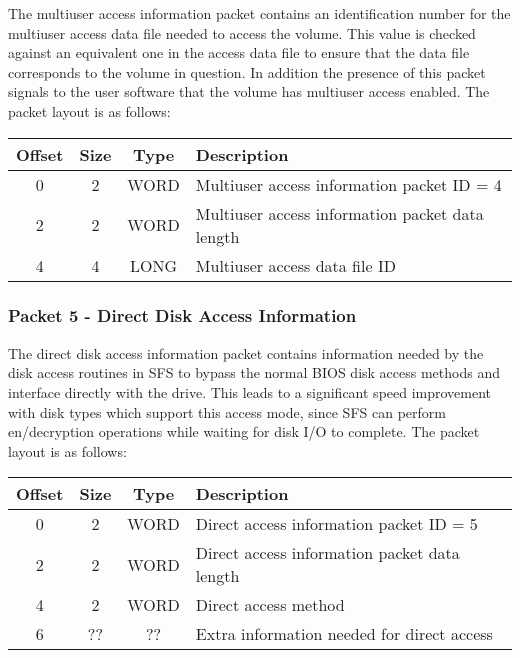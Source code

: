 The multiuser access information packet contains an identification number for
the multiuser access data file needed to access the volume.  This value is
checked against an equivalent one in the access data file to ensure that the
data file corresponds to the volume in question.  In addition the presence of
this packet signals to the user software that the volume has multiuser access
enabled.  The packet layout is as follows:

\begin{center}
\begin{tabular}{|c|c|c|l|}
\hline
    Offset & Size &   Type  &      Description\\
\hline
       0   &   2  &   WORD  &      Multiuser access information packet ID = 4\\
       2   &   2  &   WORD  &      Multiuser access information packet data length\\
       4   &   4  &   LONG  &      Multiuser access data file ID\\
\hline
\end{tabular}
\end{center}


\subsubsection{Packet 5 - Direct Disk Access Information}

The direct disk access information packet contains information needed by the
disk access routines in SFS to bypass the normal BIOS disk access methods and
interface directly with the drive.  This leads to a significant speed
improvement with disk types which support this access mode, since SFS can
perform en/decryption operations while waiting for disk I/O to complete.  The
packet layout is as follows:

\begin{center}
\begin{tabular}{|c|c|c|l|}
\hline
    Offset & Size &  Type &      Description\\
\hline
       0   &   2  &  WORD &      Direct access information packet ID = 5\\
       2   &   2  &  WORD &      Direct access information packet data length\\
       4   &   2  &  WORD &      Direct access method\\
       6   &  ??  &  ??   &      Extra information needed for direct access\\
\hline
\end{tabular}
\end{center}

